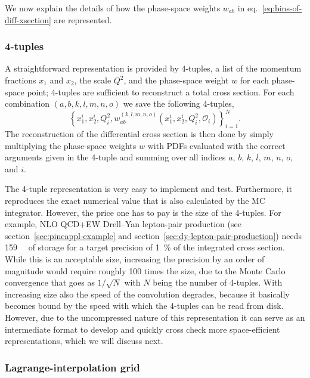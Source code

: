 We now explain the details of how the phase-space weights $w_{ab}$ in eq.~\eqref{eq:bins-of-diff-xsection} are represented.

\subsubsection{4-tuples}

A straightforward representation is provided by  4-tuples, a list of the momentum fractions $x_1$ and $x_2$, the scale $Q^2$, and the phase-space weight $w$ for each phase-space point; 4-tuples are sufficient to reconstruct a total cross section.
For each combination $(a,b,k,l,m,n,o)$ we save the following 4-tuples,
\begin{equation}
\left\{ x_1^i, x_2^i, Q^2_i, w^{(k,l,m,n,o)}_{ab} (x_1^i, x_2^i, Q^2_i, \mathcal{O}_i) \right\}_{i=1}^N \text{.} \label{eq:four-tuples}
\end{equation}
The reconstruction of the differential cross section is then done by simply multiplying the phase-space weights $w$ with PDFs evaluated with the correct arguments given in the 4-tuple and summing over all indices $a$, $b$, $k$, $l$, $m$, $n$, $o$, and $i$.

The 4-tuple representation is very easy to implement and test.
Furthermore, it reproduces the exact numerical value that is also calculated by the MC integrator.
However, the price one has to pay is the size of the 4-tuples.
For example, NLO QCD+EW Drell--Yan lepton-pair production (see section~\ref{sec:pineappl-example} and section~\ref{sec:dy-lepton-pair-production}) needs \SI{159}{\mega\byte} of storage for a target precision of \SI{1}{\percent} of the integrated cross section.
While this is an acceptable size, increasing the precision by an order of magnitude would require roughly 100 times the size, due to the Monte Carlo convergence that goes as $1/\sqrt{N}$ with $N$ being the number of 4-tuples.
With increasing size also the speed of the convolution degrades, because it basically becomes bound by the speed with which the 4-tuples can be read from disk.
However, due to the uncompressed nature of this representation it can serve as an intermediate format to develop and quickly cross check more space-efficient representations, which we will discuss next.

\subsubsection{Lagrange-interpolation grid}

